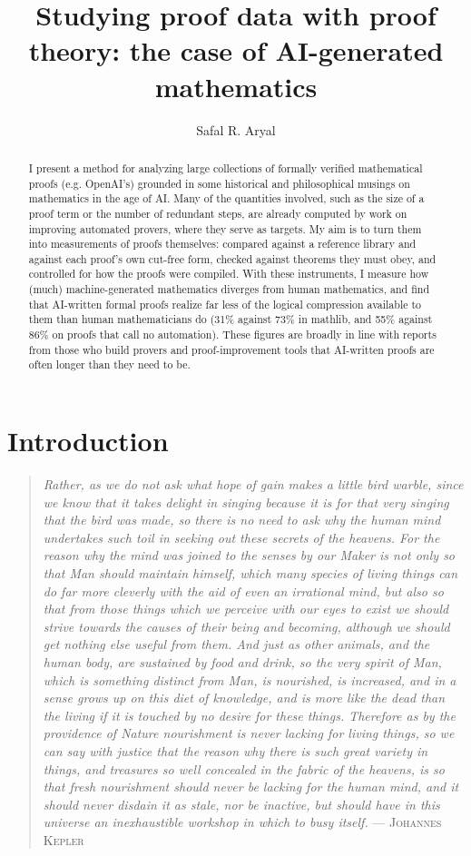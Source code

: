 \documentclass{article}
\title{Studying proof data with proof theory: the case of AI-generated mathematics}
\author{Safal R. Aryal}
\begin{document}
\doublespacing
\maketitle
\begin{abstract}
    I present a method for analyzing large collections of formally verified mathematical proofs (e.g. OpenAI's) grounded in 
    some historical and philosophical musings on mathematics in the age of AI. Many of the quantities involved, such as 
    the size of a proof term or the number of redundant steps, are already computed by work on improving 
    automated provers, where they serve as targets. My aim is to turn them into measurements of proofs themselves: 
    compared against a reference library and against each proof's own cut-free form, checked against theorems they 
    must obey, and controlled for how the proofs were compiled. With these instruments, I measure how (much) 
    machine-generated mathematics diverges from human mathematics, and find that AI-written formal proofs realize far less of the logical 
    compression available to them than human mathematicians do (31\% against 73\% in mathlib, and 55\% against 86\% 
    on proofs that call no automation). These figures are broadly in line with reports from those who build provers and 
    proof-improvement tools that AI-written proofs are often longer than they need to be.
\end{abstract}


\section{Introduction}
\begin{quote}
    \textit{
     Rather, as we do not ask what hope of gain makes a little bird warble, since we know that it takes delight in 
     singing because it is for that very singing that the bird was made, so there is no need to ask why the human 
     mind undertakes such toil in seeking out these secrets of the heavens. For the reason why the mind was joined 
     to the senses by our Maker is not only so that Man should maintain himself, which many species of living things 
     can do far more cleverly with the aid of even an irrational mind, but also so that from those things which we 
     perceive with our eyes to exist we should strive towards the causes of their being and becoming, although we 
     should get nothing else useful from them. And just as other animals, and the human body, are sustained by 
     food and drink, so the very spirit of Man, which is something distinct from Man, is nourished, is increased, 
     and in a sense grows up on this diet of knowledge, and is more like the dead than the living if it is touched 
     by no desire for these things. Therefore as by the providence of Nature nourishment is never lacking for 
     living things, so we can say with justice that the reason why there is such great variety in things, and 
     treasures so well concealed in the fabric of the heavens, is so that fresh nourishment should never be 
     lacking for the human mind, and it should never disdain it as stale, nor be inactive, but should have in 
     this universe an inexhaustible workshop in which to busy itself.}
    \hfill --- \textsc{Johannes Kepler}
\end{quote}
\end{document}
